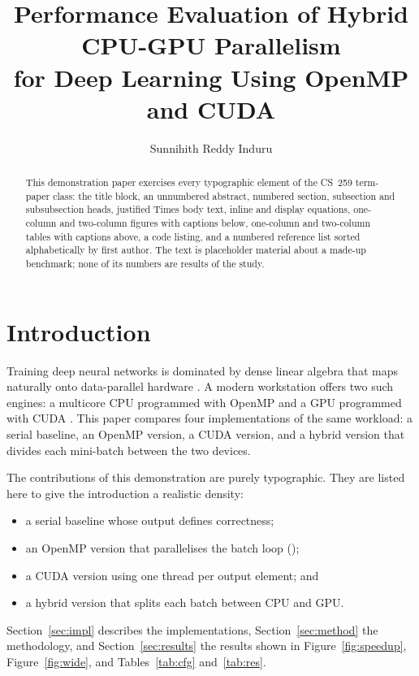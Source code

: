 \documentclass[siunitx]{cs259}
\title{Performance Evaluation of Hybrid CPU-GPU Parallelism\\
       for Deep Learning Using OpenMP and CUDA}
\author{Sunnihith Reddy Induru}
\affiliation{Computer Science Department\\
             San Jose State University\\
             San Jose, CA 95192}
\begin{document}
\maketitle

\begin{abstract}
This demonstration paper exercises every typographic element of the CS~259
term-paper class: the title block, an unnumbered abstract, numbered section,
subsection and subsubsection heads, justified Times body text, inline and
display equations, one-column and two-column figures with captions below,
one-column and two-column tables with captions above, a code listing, and a
numbered reference list sorted alphabetically by first author. The text is
placeholder material about a made-up benchmark; none of its numbers are
results of the study.
\end{abstract}

\section{Introduction}
Training deep neural networks is dominated by dense linear algebra that maps
naturally onto data-parallel hardware \cite{lecun98,krizhevsky12}. A modern
workstation offers two such engines: a multicore CPU programmed with OpenMP
\cite{openmp52,chapman08} and a GPU programmed with CUDA
\cite{cudaguide,kirk16}. This paper compares four implementations of the same
workload: a serial baseline, an OpenMP version, a CUDA version, and a hybrid
version that divides each mini-batch between the two devices.

The contributions of this demonstration are purely typographic. They are
listed here to give the introduction a realistic density:
\begin{itemize}
  \item a serial baseline whose output defines correctness;
  \item an OpenMP version that parallelises the batch loop
    ();
  \item a CUDA version using one thread per output element; and
  \item a hybrid version that splits each batch between CPU and GPU.
\end{itemize}
Section~\ref{sec:impl} describes the implementations,
Section~\ref{sec:method} the methodology, and Section~\ref{sec:results}
the results shown in Figure~\ref{fig:speedup}, Figure~\ref{fig:wide}, and
Tables~\ref{tab:cfg} and~\ref{tab:res}.
\end{document}
